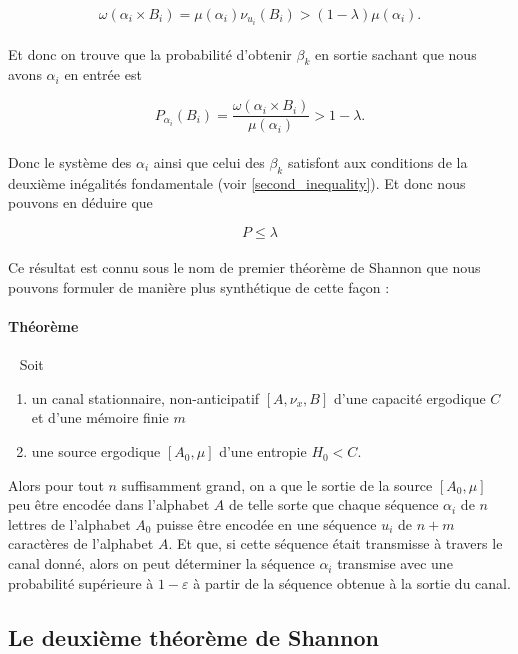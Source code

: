 	\[\omega(\alpha_i \times B_i)=\mu(\alpha_i)\nu_{u_i}(B_i)>(1-\lambda)\mu(\alpha_i).\]
	
	\paragraph{}
	Et donc on trouve que la probabilité d'obtenir $\beta_k$ en sortie sachant que nous avons $\alpha_i$ en entrée est
	
	\[P_{\alpha_i}(B_i)=\frac{\omega(\alpha_i \times B_i)}{\mu(\alpha_i)}>1-\lambda.\]
	
	\paragraph{}
	Donc le système des $\alpha_i$ ainsi que celui des $\beta_k$ satisfont aux conditions de la deuxième inégalités fondamentale (voir \ref{second_inequality}). 
	Et donc nous pouvons en déduire que
	
	\[P\le \lambda\]
	
	\paragraph{}
	Ce résultat est connu sous le nom de premier théorème de Shannon que nous pouvons formuler de manière plus synthétique de cette façon :
	
	\paragraph{Théorème}\ 
	\newline
	Soit 
	\begin{enumerate}
		\item un canal stationnaire, non-anticipatif $[A,\nu_x,B]$ d'une capacité ergodique $C$ et d'une mémoire finie $m$
		\item une source ergodique $[A_0,\mu]$ d'une entropie $H_0<C$.
	\end{enumerate}
	Alors pour tout $n$ suffisamment grand, on a que le sortie de la source $[A_0,\mu]$ peu être encodée dans l'alphabet $A$ de telle sorte que
	chaque séquence $\alpha_i$ de $n$ lettres de l'alphabet $A_0$ puisse être encodée en une séquence $u_i$ de $n+m$ caractères de l'alphabet $A$. 
	Et que, si cette séquence était transmisse à travers le canal donné, alors on peut déterminer la séquence $\alpha_i$ transmise avec une probabilité 
	supérieure à $1-\varepsilon$ à partir de la séquence obtenue à la sortie du canal.
	
\subsection{Le deuxième théorème de Shannon}

